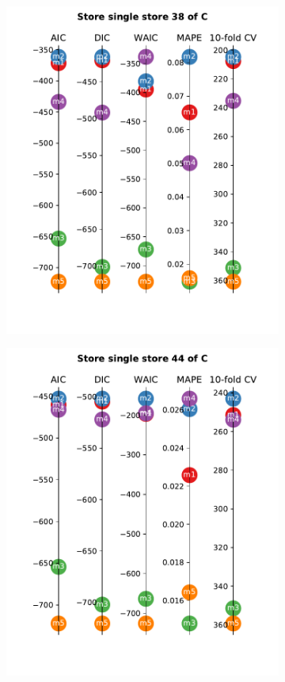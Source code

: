 \documentclass[english, 12pt, a4paper, sci, utf8, a-1b, online]{aaltothesis}
\begin{document}
\begin{figure}[hbt]
\begin{subfigure}[htb]{0.3\textwidth}
		\includegraphics[width=\textwidth]{../plots/metrics/metrics_plot_single_store_38_of_C.pdf}
	\end{subfigure}
	\hfill
	\begin{subfigure}[htb]{0.3\textwidth}
		\centering
		\includegraphics[width=\textwidth]{../plots/metrics/metrics_plot_single_store_44_of_C.pdf}

\end{subfigure}
\end{figure}
\end{document}
